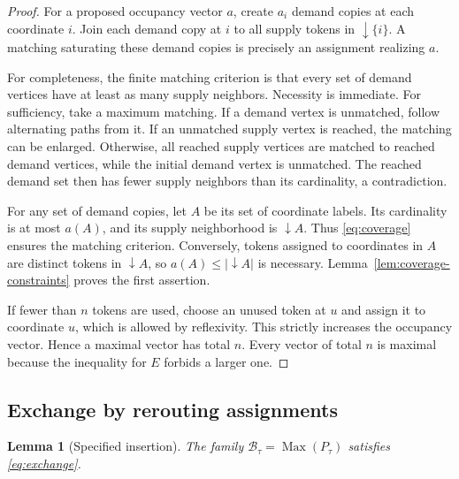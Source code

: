 \documentclass[11pt]{article}
\numberwithin{equation}{section}
\newtheorem{lemma}[theorem]{Lemma}
\theoremstyle{definition}
\theoremstyle{remark}
\newcommand{\B}{\mathcal B}
\newcommand{\Max}{\operatorname{Max}}
\begin{document}
\begin{proof}
For a proposed occupancy vector $a$, create $a_i$ demand copies at each
coordinate $i$. Join each demand copy at $i$ to all supply tokens in
$\downarrow\{i\}$. A matching saturating these demand copies is precisely an
assignment realizing $a$.

For completeness, the finite matching criterion is that every set of demand
vertices have at least as many supply neighbors. Necessity is immediate.
For sufficiency, take a maximum matching. If a demand vertex is unmatched,
follow alternating paths from it. If an unmatched supply vertex is reached,
the matching can be enlarged. Otherwise, all reached supply vertices are
matched to reached demand vertices, while the initial demand vertex is
unmatched. The reached demand set then has fewer supply neighbors than its
cardinality, a contradiction.

For any set of demand copies, let $A$ be its set of coordinate labels. Its
cardinality is at most $a(A)$, and its supply neighborhood is $\downarrow A$.
Thus \eqref{eq:coverage} ensures the matching criterion. Conversely, tokens
assigned to coordinates in $A$ are distinct tokens in $\downarrow A$, so
$a(A)\le|\downarrow A|$ is necessary.
Lemma~\ref{lem:coverage-constraints} proves the first assertion.

If fewer than $n$ tokens are used, choose an unused token at $u$ and assign
it to coordinate $u$, which is allowed by reflexivity. This strictly increases
the occupancy vector. Hence a maximal vector has total $n$. Every vector of
total $n$ is maximal because the inequality for $E$ forbids a larger one.
\end{proof}

\subsection{Exchange by rerouting assignments}

\begin{lemma}[Specified insertion]
\label{lem:assignment-exchange}
The family $\B_\tau=\Max(P_\tau)$ satisfies \eqref{eq:exchange}.
\end{lemma}
\end{document}
